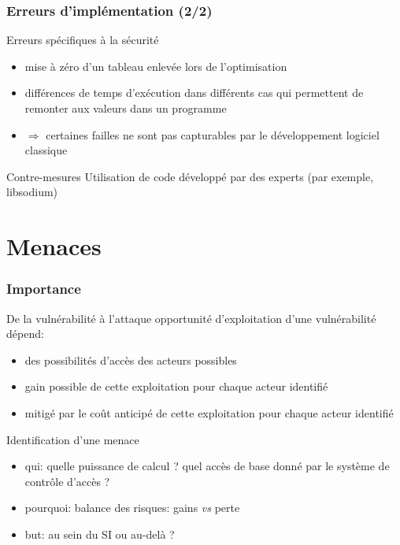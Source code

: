 \begin{reveals}
\begin{frame}
\end{frame}

\begin{frame}
  \frametitle{Erreurs d'implémentation (2/2)}

  \vfill

  \begin{block}{Erreurs spécifiques à la sécurité}
    \begin{itemize}
    \item mise à zéro d'un tableau enlevée lors de l'optimisation
    \item différences de temps d'exécution dans différents cas qui
      permettent de remonter aux valeurs dans un programme
    \item \(\Rightarrow\) certaines failles ne sont pas capturables
      par le développement logiciel classique
    \end{itemize}
  \end{block}

  \vfill

  \begin{block}{Contre-mesures}
    Utilisation de code développé par des experts (par exemple, libsodium)
  \end{block}

\end{frame}


\section{Menaces}

\begin{frame}
  \frametitle{Importance}

  \vfill

  \begin{block}{De la vulnérabilité à l'attaque}
    opportunité d'exploitation d'une vulnérabilité dépend:
    \begin{itemize}
    \item des possibilités d'accès des acteurs possibles
    \item gain possible de cette exploitation pour chaque acteur
      identifié
    \item mitigé par le coût anticipé de cette exploitation pour
      chaque acteur identifié
    \end{itemize}
  \end{block}
  \vfill

  \begin{block}{Identification d'une menace}
    \begin{itemize}
    \item qui: quelle puissance de calcul ? quel accès de base donné
      par le système de contrôle d'accès ?
    \item pourquoi: balance des risques: gains \textit{vs} perte
    \item but: au sein du SI ou au-delà ?
    \end{itemize}
  \end{block}


\end{frame}
\end{reveals}
